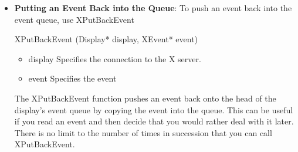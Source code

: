 \documentclass{report}
\begin{document}
\begin{itemize}
            \bigbreak \noindent 
            To return and remove the next event in the queue that matches an event type and a window, use XCheckTypedWindowEvent
            \bigbreak \noindent 
            \begin{cppcode}
            Bool XCheckTypedWindowEvent(Display* display, Window w, int event_type, XEvent* event_return)
            \end{cppcode}
            \bigbreak \noindent
            \begin{itemize}
                \item display Specifies the connection to the X server.
                \item $w$ Specifies the window.
                \item event\_type Specifies the event type to be compared.
                \item event\_return Returns the matched event’s associated structure
            \end{itemize}
            The XCheckTypedWindowEvent function searches the event queue and then any events available on the server connection for the first event that matches the specified type and window. If it finds a match, XCheckTypedWindowEvent removes the event from the queue, copies it into the specified XEvent structure, and returns True. The other events in the queue are not discarded. If the event is not available, XCheckTypedWindowEvent returns False, and the output buffer will have been flushed.
        \item \textbf{Putting an Event Back into the Queue}: To push an event back into the event queue, use XPutBackEvent
            \bigbreak \noindent 
            \begin{cppcode}
            XPutBackEvent (Display* display, XEvent* event)
            \end{cppcode}
            \bigbreak \noindent
            \begin{itemize}
                \item display Specifies the connection to the X server.
                \item event Specifies the event
            \end{itemize}
            The XPutBackEvent function pushes an event back onto the head of the display’s event queue by copying the event into the queue. This can be useful if you read an event and then decide that you would rather deal with it later. There is no limit to the number of times in succession that you can call XPutBackEvent.

\end{itemize}
\end{document}
